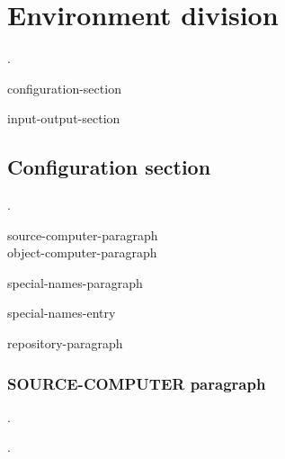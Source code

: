\chapter{Environment division}
\begin{0-1}
   .
\end{0-1}
\newline
\begin{0-1}
  configuration-section
\end{0-1}
\newline
\begin{0-1}
  input-output-section
\end{0-1}

\section{Configuration section}

\begin{0-1}
   .
\end{0-1}
\newline
\begin{0+}
  source-computer-paragraph \\
  object-computer-paragraph
\end{0+}
\newline
\begin{0-1}
  special-names-paragraph
\end{0-1}
\newline
\begin{0-1}
  special-names-entry
\end{0-1}
\newline
\begin{0-1}
  repository-paragraph
\end{0-1}

\subsection{SOURCE-COMPUTER paragraph}

.
\begin{0-1}
  \begin{1=}
    \computername
  \end{1=}\gnucobol{\ldots}
  .
\end{0-1}

